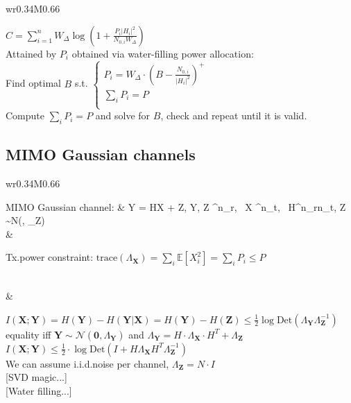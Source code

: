 \documentclass[10pt]{homework}
\newenvironment{mytable}
    { %
        \bgroup
        \centering
        \def\arraystretch{2.3}%
        \begin{longtable}{wr{0.34\textwidth}M{0.66\textwidth}}
    }
    { %
        \end{longtable}
        \egroup
    }
\newenvironment{mytextcol}
    { %
        \begin{minipage}[t]{0.6\textwidth}
    }
    { %
        \end{minipage}
    }
\begin{document}
\begin{mytable}
\begin{mytextcol}
$\displaystyle
C = \sum_{i=1}^n
W_\Delta \log\left(
1+\frac{P_i |H_i|^2}{N_{0,i} W_\Delta}
\right)
$\\[4pt]
Attained by $P_i$ obtained via water-filling power allocation:\\[4pt]
Find optimal $B$ s.t. $\displaystyle
\begin{cases}
P_i = W_\Delta\cdot \left(B-\frac{N_{0,i}}{|H_i|^2}\right)^+\\
\sum_i P_i = P \\
\end{cases}
$\\
Compute $\displaystyle\sum_i P_i = P$ and solve for $B$, check and repeat until it is valid.
\end{mytextcol}
\end{mytable}

\subsection*{MIMO Gaussian channels}
\begin{mytable}
MIMO Gaussian channel: &
\bm Y = H\cdot \bm X + \bm Z,  \bm Y, \bm Z \in {}^{n_r}, \, \bm X \in {}^{n_t}, \, H\in {}^{n_r\times n_t},\newline\phantom{MMMMMMMMMM...} \bm Z \sim \mathcal N(, \Lambda_{\bm Z})
\\[-8pt]&
\begin{mytextcol}
Tx.\@ power constraint: $
    \text{trace}(\Lambda_{\bm X}) =
    \sum_i \mathbb E [X_i^2] =
    \sum_i P_i \le P$
\end{mytextcol}
\\&
\begin{mytextcol}
$\displaystyle
I(\bm X; \bm Y) = H(\bm Y)- H(\bm Y | \bm X)
= H(\bm Y)- H(\bm Z) \le \frac{1}{2}\log \text{Det}(\Lambda_{\bm Y} \Lambda_{\bm Z}^{-1})$
\\[4pt]
equality iff $\bm Y \sim \mathcal N(\bm 0, \Lambda_{\bm Y})$
and $\Lambda_{\bm Y}= H \cdot \Lambda_{\bm X} \cdot H^T+ \Lambda_{\bm Z}$
\\[4pt]
$\displaystyle
I(\bm X; \bm Y) \le \frac{1}{2}\cdot 
\log \text{Det}(I+H\Lambda_{\bm X} H^T\Lambda^{-1}_{\bm Z})
$
\\
We can assume i.i.d.\@ noise per channel, $\Lambda_{\bm Z} = N\cdot I$
\\[4pt]
[SVD magic...]
\\[4pt]
[Water filling...]
\end{mytextcol}
\end{mytable}
\end{document}
